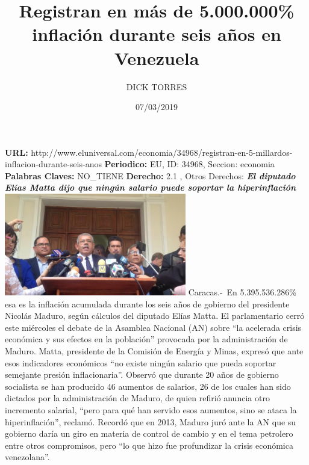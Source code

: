 \documentclass{article}%
\title{\textbf{Registran en más de 5.000.000\% inflación durante seis años en Venezuela}}%
\author{DICK TORRES}%
\date{07/03/2019}%
\begin{document}
%
\normalsize%
\maketitle%
\textbf{URL: }%
http://www.eluniversal.com/economia/34968/registran{-}en{-}5{-}millardos{-}inflacion{-}durante{-}seis{-}anos\newline%
%
\textbf{Periodico: }%
EU, %
ID: %
34968, %
Seccion: %
economia\newline%
%
\textbf{Palabras Claves: }%
NO\_TIENE\newline%
%
\textbf{Derecho: }%
2.1%
, Otros Derechos: %
\newline%
%
\textbf{\textit{El diputado Elías Matta dijo que ningún salario puede soportar la hiperinflación}}%
\newline%
\newline%
%
\includegraphics[width=300px]{EU_34968.jpg}%
\newline%
%
Caracas.{-}~En 5.395.536.286\% esa es la inflación acumulada durante los seis años de gobierno del presidente Nicolás Maduro, según cálculos del diputado Elías Matta.%
\newline%
%
El parlamentario cerró este miércoles el debate de la Asamblea Nacional (AN) sobre “la acelerada crisis económica y sus efectos en la población” provocada por la administración de Maduro.%
\newline%
%
Matta, presidente de la Comisión de Energía y Minas, expresó que ante esos indicadores  económicos “no existe ningún salario que pueda soportar semejante presión inflacionaria”.%
\newline%
%
Observó que durante 20 años de gobierno socialista se han producido 46 aumentos de salarios, 26 de los cuales han sido dictados por la administración de Maduro, de quien refirió anuncia otro incremento salarial, “pero para qué han servido esos aumentos, sino se ataca la hiperinflación”, reclamó.%
\newline%
%
Recordó que en 2013, Maduro juró ante la AN que su gobierno daría un giro en materia de control de cambio y en el tema petrolero entre otros compromisos, pero “lo que hizo fue profundizar la crisis económica venezolana”.%
\end{document}
